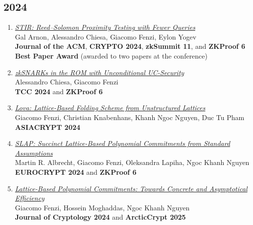 \documentclass[11pt,a4paper]{article}
\begin{document}
\subsection*{2024}
\begin{enumerate}
  \item \href{https://eprint.iacr.org/2024/390}{\textit{STIR: Reed--Solomon Proximity Testing with Fewer Queries}}\\
  Gal Arnon, Alessandro Chiesa, Giacomo Fenzi, Eylon Yogev\\
  \textbf{Journal of the ACM}, \textbf{CRYPTO 2024}, \textbf{zkSummit 11}, and \textbf{ZKProof 6}\\
  \textbf{Best Paper Award} (awarded to two papers at the conference)

  \item \href{https://eprint.iacr.org/2024/724}{\textit{zkSNARKs in the ROM with Unconditional UC-Security}}\\
  Alessandro Chiesa, Giacomo Fenzi\\
  \textbf{TCC 2024} and \textbf{ZKProof 6}

  \item \href{https://eprint.iacr.org/2024/1964}{\textit{Lova: Lattice-Based Folding Scheme from Unstructured Lattices}}\\
  Giacomo Fenzi, Christian Knabenhans, Khanh Ngoc Nguyen, Duc Tu Pham\\
  \textbf{ASIACRYPT 2024}

  \item \href{https://eprint.iacr.org/2023/1469}{\textit{SLAP: Succinct Lattice-Based Polynomial Commitments from Standard Assumptions}}\\
  Martin R. Albrecht, Giacomo Fenzi, Oleksandra Lapiha, Ngoc Khanh Nguyen\\
  \textbf{EUROCRYPT 2024} and \textbf{ZKProof 6}

  \item \href{https://eprint.iacr.org/2023/846}{\textit{Lattice-Based Polynomial Commitments: Towards Concrete and Asymptotical Efficiency}}\\
  Giacomo Fenzi, Hossein Moghaddas, Ngoc Khanh Nguyen\\
  \textbf{Journal of Cryptology 2024} and \textbf{ArcticCrypt 2025}
\end{enumerate}
\end{document}
